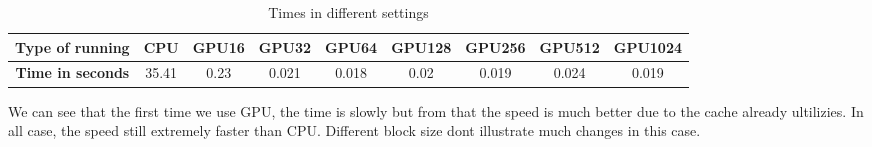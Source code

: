 \documentclass{article}
\begin{document}
\newpage
\begin{table}
\caption{Times in different settings}
\begin{tabular}{|c|c|c|c|c|c|c|c|c|}
\hline
\bfseries Type of running &CPU  &GPU16  &GPU32   &GPU64   &GPU128    &GPU256   &GPU512   &GPU1024     \\
\hline\hline
\bfseries Time in seconds     &35.41   &0.23 &0.021 &0.018 &0.02 &0.019 &0.024 &0.019    \\
\hline
\end{tabular}
\end{table} 
We can see that the first time we use GPU, the time is slowly but from that the speed is much better due to the cache already ultilizies. In all case, the speed still extremely faster than CPU. Different block size dont illustrate much changes in this case.
\end{document}
